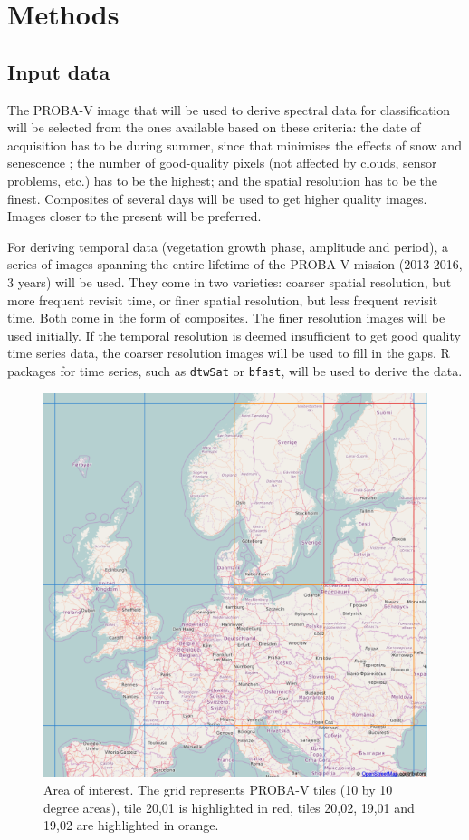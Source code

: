 \documentclass[a4paper,10pt]{article}
\begin{document}
\section{Methods}

\subsection{Input data}

The PROBA-V image that will be used to derive spectral data for classification will be selected from the ones available based on these criteria: the date of acquisition has to be during summer, since that minimises the effects of snow and senescence \cite{bartalev2014probavboreal}; the number of good-quality pixels (not affected by clouds, sensor problems, etc.) has to be the highest; and the spatial resolution has to be the finest. Composites of several days will be used to get higher quality images. Images closer to the present will be preferred.

For deriving temporal data (vegetation growth phase, amplitude and period), a series of images spanning the entire lifetime of the PROBA-V mission (2013-2016, 3 years) will be used. They come in two varieties: coarser spatial resolution, but more frequent revisit time, or finer spatial resolution, but less frequent revisit time. Both come in the form of composites. The finer resolution images will be used initially. If the temporal resolution is deemed insufficient to get good quality time series data, the coarser resolution images will be used to fill in the gaps. R packages for time series, such as \texttt{dtwSat} or \texttt{bfast}, will be used to derive the data.

\begin{figure}
 \includegraphics[width=\textwidth]{./proposal-figures/probavgrid.png}
 \caption{Area of interest. The grid represents PROBA-V tiles (10 by 10 degree areas), tile 20,01 is highlighted in red, tiles 20,02, 19,01 and 19,02 are highlighted in orange.}
 \label{AOI}
\end{figure} 
\end{document}
